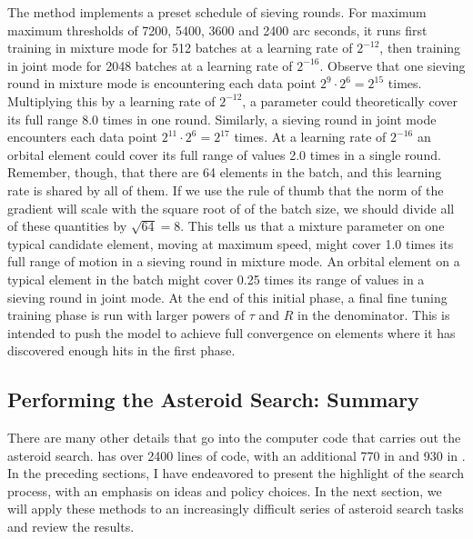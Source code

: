 The method  implements a preset schedule of sieving rounds.
For maximum maximum thresholds of 7200, 5400, 3600 and 2400 arc seconds, 
it runs first training in mixture mode for 512 batches at a learning rate of $2^{-12}$, 
then training in joint mode for 2048 batches at a learning rate of $2^{-16}$.
Observe that one sieving round in mixture mode is encountering each data point $2^{9} \cdot 2^{6} = 2^{15}$ times.
Multiplying this by a learning rate of $2^{-12}$, a parameter could theoretically cover its full range 8.0 times in one round.
Similarly, a sieving round in joint mode encounters each data point $2^{11} \cdot 2^{6} = 2^{17}$ times.
At a learning rate of $2^{-16}$ an orbital element could cover its full range of values 2.0 times in a single round.
Remember, though, that there are 64 elements in the batch, and this learning rate is shared by all of them.
If we use the rule of thumb that the norm of the gradient will scale with the square root of of the batch size,
we should divide all of these quantities by $\sqrt{64} = 8$.
This tells us that a mixture parameter on one typical candidate element, moving at maximum speed,
might cover 1.0 times its full range of motion in a sieving round in mixture mode.
An orbital element on a typical element in the batch might cover 0.25 times its range of values
in a sieving round in joint mode.
At the end of this initial phase, a final fine tuning training phase is run with larger powers of $\tau$ and $R$ in the denominator.
This is intended to push the model to achieve full convergence on elements where it has discovered enough hits in the first phase.

\subsection{Performing the Asteroid Search: Summary}
There are many other details that go into the computer code that carries out the asteroid search.
 has over 2400 lines of code, with an additional 770 in  and 930 in .
In the preceding sections, I have endeavored to present the highlight of the search process, with an emphasis on ideas and policy choices.
In the next section, we will apply these methods to an increasingly difficult series of asteroid search tasks and review the results.